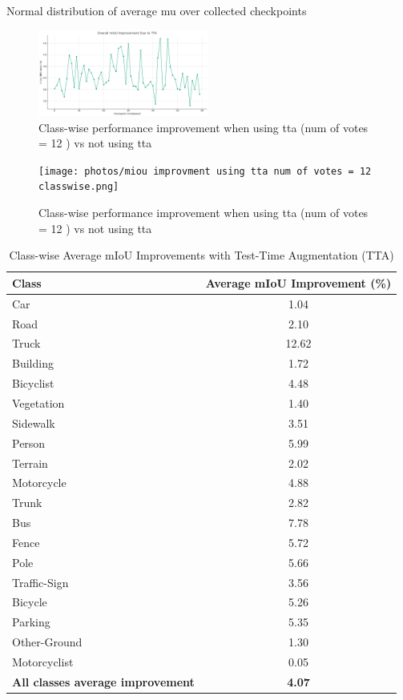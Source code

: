 \documentclass[10pt,twocolumn,letterpaper]{article}
\begin{document}
Normal distribution of average mu over collected checkpoints 


\begin{figure}[!h]
    \centering
    \includegraphics[width=0.5\textwidth]{photos/miou improvement using tta num of votes =12.png}
    \caption{Class-wise performance improvement when using tta (num of votes = 12 ) vs not using tta}
    \label{fig:photo_example}
\end{figure}


\begin{figure}[!h]
    \centering
    \texttt{[image: photos/miou improvment using tta num of votes = 12 classwise.png]}
    \caption{Class-wise performance improvement when using tta (num of votes = 12 ) vs not using tta}
    \label{fig:photo_example}
\end{figure}


\begin{table}[!h]
\centering
\begin{tabular}{l c}
\hline
Class & Average mIoU Improvement (\%) \\
\hline
Car & 1.04 \\
Road & 2.10 \\
Truck & 12.62 \\
Building & 1.72 \\
Bicyclist & 4.48 \\
Vegetation & 1.40 \\
Sidewalk & 3.51 \\
Person & 5.99 \\
Terrain & 2.02 \\
Motorcycle & 4.88 \\
Trunk & 2.82 \\
Bus & 7.78 \\
Fence & 5.72 \\
Pole & 5.66 \\
Traffic-Sign & 3.56 \\
Bicycle & 5.26 \\
Parking & 5.35 \\
Other-Ground & 1.30 \\
Motorcyclist & 0.05 \\
\hline
\textbf{All classes average improvement} & \textbf{4.07} \\\hline
\end{tabular}
\caption{Class-wise Average mIoU Improvements with Test-Time Augmentation (TTA)}
\label{tab:tta_miou_improvements}
\end{table}
\end{document}
